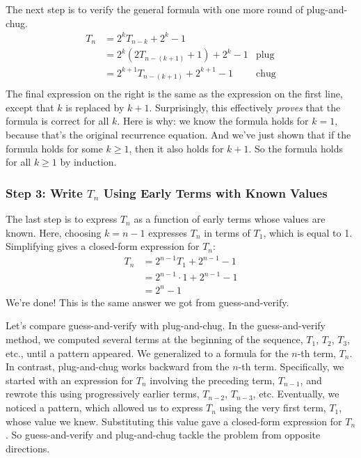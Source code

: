 The next step is to verify the general formula with one more round of plug-and-chug.
\begin{align*}
T_n & = 2^k T_{n-k} + 2^k - 1 \\
  & = 2^k (2 T_{n-(k+1)} + 1) + 2^k - 1 & \text{plug} \\
  & = 2^{k+1} T_{n-(k+1)} + 2^{k+1} - 1 & \text{chug} \\
\end{align*}
The final expression on the right is the same as the expression on the
first line, except that $k$ is replaced by $k+1$.  Surprisingly, this
effectively \emph{proves} that the formula is correct for all $k$.
Here is why: we know the formula holds for $k = 1$, because that's the
original recurrence equation.  And we've just shown that if the
formula holds for some $k \geq 1$, then it also holds for $k + 1$.  So
the formula holds for all $k \geq 1$ by induction.

\subsubsection*{Step 3: Write $T_n$ Using Early Terms with Known Values}

The last step is to express $T_n$ as a function of early terms whose
values are known.  Here, choosing $k = n - 1$ expresses $T_n$ in terms
of $T_1$, which is equal to 1.  Simplifying gives a closed-form
expression for $T_n$:
\begin{align*}
T_n & = 2^{n - 1} T_1 + 2^{n-1} - 1 \\
  & = 2^{n-1} \cdot 1 + 2^{n-1} - 1 \\
  & = 2^n -1
\end{align*}
We're done!  This is the same answer we got from guess-and-verify.

\vspace{1ex}

Let's compare guess-and-verify with plug-and-chug.  In the
guess-and-verify method, we computed several terms at the beginning of
the sequence, $T_1$, $T_2$, $T_3$, etc., until a pattern appeared.  We
generalized to a formula for the $n$-th term, $T_n$.  In contrast,
plug-and-chug works backward from the $n$-th term.  Specifically, we
started with an expression for $T_n$ involving the preceding term,
$T_{n-1}$, and rewrote this using progressively earlier terms,
$T_{n-2}$, $T_{n-3}$, etc.  Eventually, we noticed a pattern, which
allowed us to express $T_n$ using the very first term, $T_1$, whose
value we knew.  Substituting this value gave a closed-form expression
for $T_n$.  So guess-and-verify and plug-and-chug tackle the problem
from opposite directions.

